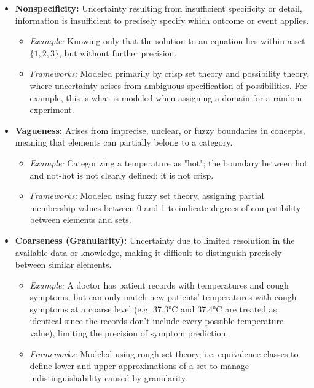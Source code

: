\begin{itemize}
    \item \textbf{Nonspecificity:} Uncertainty resulting from insufficient specificity or detail, information is insufficient to precisely specify which outcome or event applies. 
    \begin{itemize}
        \item \textit{Example:} Knowing only that the solution to an equation lies within a set \(\{1, 2, 3\}\), but without further precision.
        \item \textit{Frameworks:} Modeled primarily by crisp set theory and possibility theory, where uncertainty arises from ambiguous specification of possibilities. For example, this is what is modeled when assigning a domain for a random experiment.
    \end{itemize}

    \item \textbf{Vagueness:} Arises from imprecise, unclear, or fuzzy boundaries in concepts, meaning that elements can partially belong to a category. 
    \begin{itemize}
        \item \textit{Example:} Categorizing a temperature as "hot"; the boundary between hot and not-hot is not clearly defined; it is not crisp.
        \item \textit{Frameworks:} Modeled using fuzzy set theory, assigning partial membership values between 0 and 1 to indicate degrees of compatibility between elements and sets.
    \end{itemize}

    \item \textbf{Coarseness (Granularity):} Uncertainty due to limited resolution in the available data or knowledge, making it difficult to distinguish precisely between similar elements.
    \begin{itemize}
        \item \textit{Example:} A doctor has patient records with temperatures and cough symptoms, but can only match new patients' temperatures with cough symptoms at a coarse level (e.g. 37.3°C and 37.4°C are treated as identical since the records don't include every possible temperature value), limiting the precision of symptom prediction.
        \item \textit{Frameworks:} Modeled using rough set theory, i.e. equivalence classes to define lower and upper approximations of a set to manage indistinguishability caused by granularity.
    \end{itemize}


\end{itemize}
